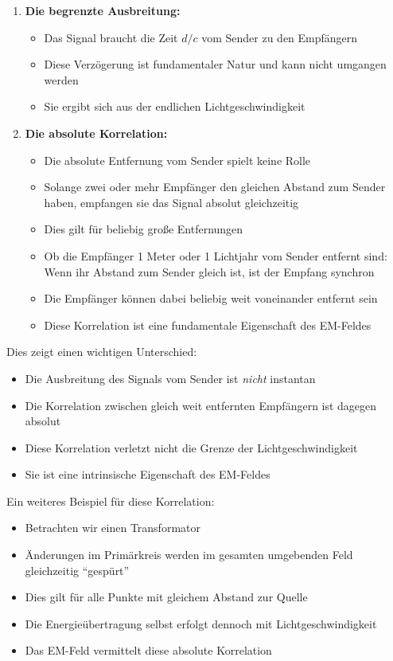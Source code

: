 \documentclass[12pt,a4paper]{article}
\begin{document}
	\begin{enumerate}
		\item \textbf{Die begrenzte Ausbreitung:}
		\begin{itemize}
			\item Das Signal braucht die Zeit $d/c$ vom Sender zu den Empfängern
			\item Diese Verzögerung ist fundamentaler Natur und kann nicht umgangen werden
			\item Sie ergibt sich aus der endlichen Lichtgeschwindigkeit
		\end{itemize}
		
		\item \textbf{Die absolute Korrelation:}
		\begin{itemize}
			\item Die absolute Entfernung vom Sender spielt keine Rolle
			\item Solange zwei oder mehr Empfänger den gleichen Abstand zum Sender haben, empfangen sie das Signal absolut gleichzeitig
			\item Dies gilt für beliebig große Entfernungen
			\item Ob die Empfänger 1 Meter oder 1 Lichtjahr vom Sender entfernt sind: Wenn ihr Abstand zum Sender gleich ist, ist der Empfang synchron
			\item Die Empfänger können dabei beliebig weit voneinander entfernt sein
			\item Diese Korrelation ist eine fundamentale Eigenschaft des EM-Feldes
		\end{itemize}
	\end{enumerate}
	
	Dies zeigt einen wichtigen Unterschied:
	\begin{itemize}
		\item Die Ausbreitung des Signals vom Sender ist \textit{nicht} instantan
		\item Die Korrelation zwischen gleich weit entfernten Empfängern ist dagegen absolut
		\item Diese Korrelation verletzt nicht die Grenze der Lichtgeschwindigkeit
		\item Sie ist eine intrinsische Eigenschaft des EM-Feldes
	\end{itemize}
	
	Ein weiteres Beispiel für diese Korrelation:
	\begin{itemize}
		\item Betrachten wir einen Transformator
		\item Änderungen im Primärkreis werden im gesamten umgebenden Feld gleichzeitig ``gespürt''
		\item Dies gilt für alle Punkte mit gleichem Abstand zur Quelle
		\item Die Energieübertragung selbst erfolgt dennoch mit Lichtgeschwindigkeit
		\item Das EM-Feld vermittelt diese absolute Korrelation
	\end{itemize}
	
\end{document}
